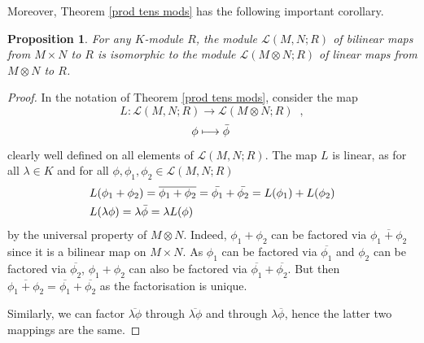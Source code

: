 \documentclass{report}
\newtheorem{prop}{Proposition}
\theoremstyle{definition}
\theoremstyle{remark}
\begin{document}
     
    Moreover, Theorem \ref{prod tens mods} has the following important corollary.
    
    \begin{prop}
     For any $K$-module $R$, the module $\mathcal{L}(M,N;R)$ of bilinear maps from $M \times N$ to $R$ is isomorphic to the module $\mathcal{L}(M \otimes N;R)$ of linear maps from $M \otimes N$ to $R$. 
    \end{prop}
   
    
    \begin{proof}
        In the notation of Theorem \ref{prod tens mods}, consider the map $$L : \mathcal{L}(M,N;R) \longrightarrow \mathcal{L}(M\otimes N;R)\;\;,$$ $$\phi \longmapsto \Bar{\phi}\;$$
    clearly well defined on all elements of $\mathcal{L}(M,N;R)$. The map $L$ is linear, as for all $\lambda \in K$ and for all $\phi,\phi_1,\phi_2\in \mathcal{L}(M,N;R)$ 
    \begin{equation*}
        \begin{split}
            & L (\phi_1+\phi_2) = \overline{\phi_1+\phi_2} = \Bar{\phi_1} + \Bar{\phi_2} = L(\phi_1) + L(\phi_2) \\
            & L(\lambda \phi) = \lambda \Bar{\phi} =\lambda L(\phi)
        \end{split}
    \end{equation*} by the universal property of $M \otimes N$. Indeed, $\phi_1 + \phi_2$ can be factored via $\overline{\phi_1 + \phi_2}$ since it is a bilinear map on $M\times N$. As $\phi_1$ can be factored via $\overline{\phi_1}$ and $\phi_2$ can be factored via $\overline{\phi_2}$, $\phi_1 + \phi_2$ can also be factored via $\overline{\phi_1} + \overline{\phi_2}$. But then $\overline{\phi_1 + \phi_2} = \overline{\phi_1} + \overline{\phi_2}$ as the factorisation is unique. 
    
    Similarly, we can factor $\overline{\lambda \phi}$ through $\overline{\lambda \phi}$ and through $\lambda \overline{\phi}$, hence the latter two mappings are the same. 
    



\end{proof}
\end{document}
